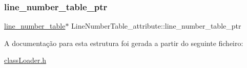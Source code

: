 \subsubsection{\texorpdfstring{line\+\_\+number\+\_\+table\+\_\+ptr}{line\_number\_table\_ptr}}
{\footnotesize\ttfamily \hyperlink{structline__number__table}{line\+\_\+number\+\_\+table}$\ast$ Line\+Number\+Table\+\_\+attribute\+::line\+\_\+number\+\_\+table\+\_\+ptr}



A documentação para esta estrutura foi gerada a partir do seguinte ficheiro\+:\begin{DoxyCompactItemize}
\item 
\hyperlink{class_loader_8h}{class\+Loader.\+h}\end{DoxyCompactItemize}
